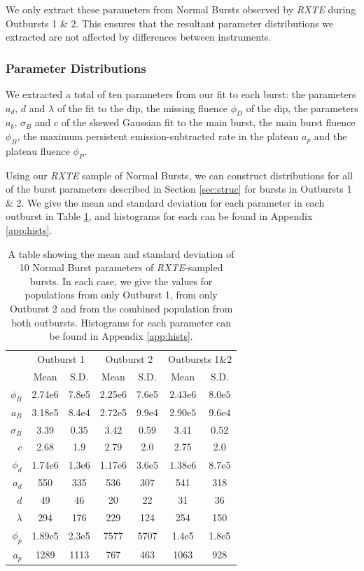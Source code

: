 \par We only extract these parameters from Normal Bursts observed by \textit{RXTE} during Outbursts 1 \& 2.  This ensures that the resultant parameter distributions we extracted are not affected by differences between instruments.

\subsubsection{Parameter Distributions}

\label{sec:hists}

\par We extracted a total of ten parameters from our fit to each burst: the parameters $a_d$, $d$ and $\lambda$ of the fit to the dip, the missing fluence $\phi_D$ of the dip, the parameters $a_b$, $\sigma_B$ and $c$ of the skewed Gaussian fit to the main burst, the main burst fluence $\phi_B$, the maximum persistent emission-subtracted rate in the plateau $a_p$ and the plateau fluence $\phi_P$.
\par Using our \textit{RXTE} sample of Normal Bursts, we can construct distributions for all of the burst parameters described in Section \ref{sec:struc} for bursts in Outbursts 1 \& 2.  We give the mean and standard deviation for each parameter in each outburst in Table \ref{tab:params_perob}, and histograms for each can be found in Appendix \ref{app:hists}.

\begin{table}
\centering
\begin{tabular}{r c c c c c c}
\hline
\hline
 & \multicolumn{2}{c}{\scriptsize Outburst 1} & \multicolumn{2}{c}{\scriptsize Outburst 2} & \multicolumn{2}{c}{\scriptsize Outbursts 1\&2}  \\
 &Mean&S.D.&Mean&S.D.&Mean&S.D.\\
\hline
$\phi_B$&2.74e6&7.8e5&2.25e6&7.6e5&$2.43\mathrm{e}6$&$8.0\mathrm{e}5$\\
$a_B$&3.18e5&8.4e4&2.72e5&9.9e4&$2.90\mathrm{e}5$&$9.6\mathrm{e}4$\\
$\sigma_B$&3.39&0.35&3.42&0.59&3.41&0.52\\
$c$&2.68&1.9&2.79&2.0&2.75&2.0\\
$\phi_d$&1.74e6&1.3e6&1.17e6&3.6e5&$1.38\mathrm{e}6$&$8.7\mathrm{e}5$\\
$a_d$&550&335&536&307&541&318\\
$d$&49&46&20&22&31&36\\
$\lambda$&294&176&229&124&254&150\\
$\phi_p$&1.89e5&2.3e5&7577&5707&1.4e5&1.8e5\\
$a_p$&1289&1113&767&463&1063&928\\
\hline
\hline
\end{tabular}
\caption{A table showing the mean and standard deviation of 10 Normal Burst parameters of \textit{RXTE}-sampled bursts.  In each case, we give the values for populations from only Outburst 1, from only Outburst 2 and from the combined population from both outbursts.  Histograms for each parameter can be found in Appendix \ref{app:hists}.}
\label{tab:params_perob}
\end{table}

